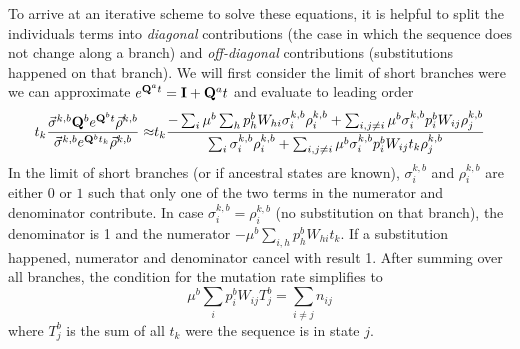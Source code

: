 \documentclass[aps,rmp, onecolumn]{revtex4}
\newcommand{\mat}[1]{{\bf #1}}
\newcommand{\eqp}{p}
\begin{document}
To arrive at an iterative scheme to solve these equations, it is helpful to split the individuals terms into \emph{diagonal} contributions (the case in which the sequence does not change along a branch) and \emph{off-diagonal} contributions (substitutions happened on that branch).
We will first consider the limit of short branches were we can approximate $e^{\mat{Q}^at}=\mat{I} + \mat{Q}^at$ and evaluate to leading order
\begin{equation}
\begin{split}
t_k\frac{\vec{\sigma}^{k,b} \mat{Q}^{b} e^{\mat{Q}^{b}t} \vec{\rho}^{k,b}}{\vec{\sigma}^{k,b} e^{\mat{Q}^{b}t_k} \vec{\rho}^{k,b}} \approx &	t_k \frac{-\sum_{i} \mu^b\sum_h p_h^b W_{hi} \sigma^{k,b}_i \rho^{k,b}_i + \sum_{i, j\neq i} \mu^b\sigma^{k,b}_i p_i^bW_{ij} \rho^{k,b}_j}{\sum_{i} \sigma^{k,b}_i \rho^{k,b}_i + \sum_{i,j\neq i} \mu^b \sigma^{k,b}_i \eqp_i^b W_{ij}t_k \rho^{k,b}_j}\\
\end{split}
\end{equation}
In the limit of short branches (or if ancestral states are known), $\sigma^{k,b}_i$ and $\rho^{k,b}_i$ are either $0$ or $1$ such that only one of the two terms in the numerator and denominator contribute.
In case $\sigma^{k,b}_i=\rho^{k,b}_i$ (no substitution on that branch), the denominator is 1 and the numerator $- \mu^b \sum_{i,h}p_h^b W_{hi}t_k$.
If a substitution happened, numerator and denominator cancel with result 1.
After summing over all branches, the condition for the mutation rate simplifies to
\begin{equation}
	\mu^b \sum_i \eqp_i^b W_{ij}T_j^b = \sum_{i\neq j} n_{ij}
\end{equation}
where $T_j^b$ is the sum of all $t_k$ were the sequence is in state $j$.




\end{document}
